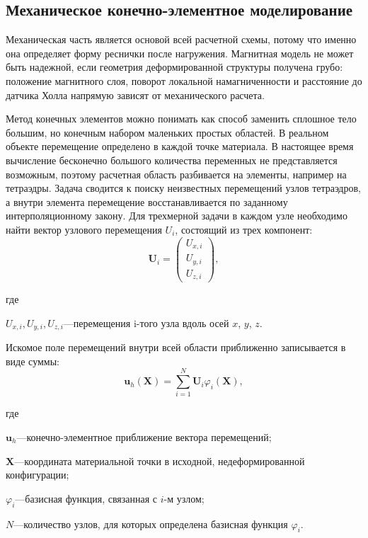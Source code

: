 \documentclass[14pt,a4paper]{extarticle}
\newif\ifwherefirst
\newcommand{\whereitem}[2]{%
    \ifwherefirst
        \wherefirstfalse
        #1\hspace{0.25em}---\hspace{0.25em}#2\par
    \else
        \noindent\hspace*{\parindent}\hphantom{где\enspace}#1\hspace{0.25em}---\hspace{0.25em}#2\par
    \fi
}
\newenvironment{whereblock}{%
    \vspace*{-1.55\baselineskip}%
    \begingroup
    \singlespacing
    \wherefirsttrue
    \par\indent где\enspace\ignorespaces
}{%
    \par\endgroup
    \par\vspace{\baselineskip}
}
\begin{document}
\subsection{Механическое конечно-элементное моделирование}

Механическая часть является основой всей расчетной схемы, потому что именно она определяет форму реснички после нагружения. Магнитная модель не может быть надежной, если геометрия деформированной структуры получена грубо: положение магнитного слоя, поворот локальной намагниченности и расстояние до датчика Холла напрямую зависят от механического расчета.

Метод конечных элементов можно понимать как способ заменить сплошное тело большим, но конечным набором маленьких простых областей. В реальном объекте перемещение определено в каждой точке материала. В настоящее время вычисление бесконечно большого количества переменных не представляется возможным, поэтому расчетная область разбивается на элементы, например на тетраэдры. Задача сводится к поиску неизвестных перемещений узлов тетраэдров, а внутри элемента перемещение восстанавливается по заданному интерполяционному закону. Для трехмерной задачи в каждом узле необходимо найти вектор узлового перемещения $U_i$, состоящий из трех компонент:
\begin{equation}
    \mathbf{U}_i
    =
    \begin{pmatrix}
        U_{x,i}\\
        U_{y,i}\\
        U_{z,i}
    \end{pmatrix},
\end{equation}
\begin{whereblock}
\whereitem{\(U_{x,i},U_{y,i},U_{z,i}\)}{перемещения i-того узла вдоль осей \(x\), \(y\), \(z\).}
\end{whereblock}

Искомое поле перемещений внутри всей области приближенно записывается в виде суммы:
\begin{equation}
    \mathbf{u}_h(\mathbf{X})
    =
    \sum_{i=1}^{N}
    \mathbf{U}_i\varphi_i(\mathbf{X}),
\end{equation}
\begin{whereblock}
\whereitem{\(\mathbf{u}_h\)}{конечно-элементное приближение вектора перемещений;}
\whereitem{\(\mathbf{X}\)}{координата материальной точки в исходной, недеформированной конфигурации;}
\whereitem{\(\varphi_i\)}{базисная функция, связанная с \(i\)-м узлом;}
\whereitem{\(N\)}{количество узлов, для которых определена базисная функция \(\varphi_i\).}
\end{whereblock}
\end{document}
